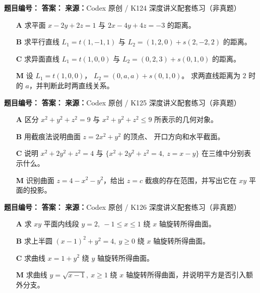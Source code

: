 \begin{problemBox}
\begin{problemMeta}
\textbf{题目编号：} \quad
\textbf{答案：} \quad
\textbf{来源：}Codex 原创 / K124 深度讲义配套练习（非真题）
\end{problemMeta}
\begin{enumerate}
  \item[\textbf{A}] 求平面 \(x-2y+2z=1\) 与
  \(2x-4y+4z=-3\) 的距离。
  \item[\textbf{B}] 求平行直线
  \(L_1=t(1,-1,1)\) 与
  \(L_2=(1,2,0)+s(2,-2,2)\) 的距离。
  \item[\textbf{C}] 求异面直线
  \(L_1=t(1,0,0)\) 与
  \(L_2=(0,2,3)+s(0,1,0)\) 的距离。
  \item[\textbf{M}] 设
  \(L_1=t(1,0,0)\)，
  \(L_2=(0,a,a)+s(0,1,0)\)。
  求两直线距离为 \(2\) 时的 \(a\)，并判断此时两直线关系。
\end{enumerate}
\end{problemBox}

\begin{problemBox}
\begin{problemMeta}
\textbf{题目编号：} \quad
\textbf{答案：} \quad
\textbf{来源：}Codex 原创 / K125 深度讲义配套练习（非真题）
\end{problemMeta}
\begin{enumerate}
  \item[\textbf{A}] 区分 \(x^2+y^2+z^2=9\) 与
  \(x^2+y^2+z^2\le9\) 所表示的几何对象。
  \item[\textbf{B}] 用截痕法说明曲面 \(z=2x^2+y^2\) 的顶点、
  开口方向和水平截面。
  \item[\textbf{C}] 说明
  \(x^2+2y^2+z^2=4\) 与
  \(\{x^2+2y^2+z^2=4,\ z=x-y\}\) 在三维中分别表示什么。
  \item[\textbf{M}] 识别曲面 \(z=4-x^2-y^2\)，给出
  \(z=c\) 截痕的存在范围，并写出它在 \(xy\) 平面的投影。
\end{enumerate}
\end{problemBox}

\begin{problemBox}
\begin{problemMeta}
\textbf{题目编号：} \quad
\textbf{答案：} \quad
\textbf{来源：}Codex 原创 / K126 深度讲义配套练习（非真题）
\end{problemMeta}
\begin{enumerate}
  \item[\textbf{A}] 求 \(xy\) 平面内线段
  \(y=2,\ -1\le x\le1\) 绕 \(x\) 轴旋转所得曲面。
  \item[\textbf{B}] 求上半圆 \((x-1)^2+y^2=4,\ y\ge0\)
  绕 \(x\) 轴旋转所得曲面。
  \item[\textbf{C}] 求曲线 \(x=1+y^2\) 绕 \(y\) 轴旋转所得曲面。
  \item[\textbf{M}] 求曲线 \(y=\sqrt{x-1},\ x\ge1\)
  绕 \(x\) 轴旋转所得曲面，并说明平方是否引入额外分支。
\end{enumerate}
\end{problemBox}

